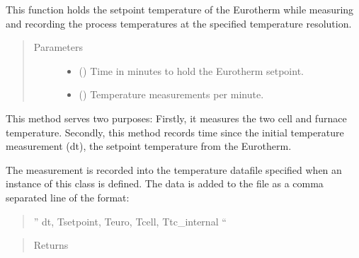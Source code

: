 \documentclass[letterpaper,10pt,english]{sphinxmanual}
\begin{document}
\begin{fulllineitems}
\begin{fulllineitems}
\label{\detokenize{vtipy_docs/vtipy:vtipy.temperature.temperature_controllers.hold}}
This function holds the setpoint temperature of the Eurotherm
while measuring and recording the process temperatures at the
specified temperature resolution.
\begin{quote}\begin{description}
\item[{Parameters}] \leavevmode\begin{itemize}
\item {} 
 () \textendash{} Time in minutes to hold the Eurotherm setpoint.

\item {} 
 () \textendash{} Temperature measurements per minute.

\end{itemize}

\end{description}\end{quote}

\end{fulllineitems}


\begin{fulllineitems}
\label{\detokenize{vtipy_docs/vtipy:vtipy.temperature.temperature_controllers.measure_temperatures}}
This method serves two purposes: Firstly, it measures the two cell and
furnace temperature. Secondly, this method records time since the
initial temperature measurement (dt), the setpoint temperature from
the Eurotherm.

The measurement is recorded into the temperature datafile specified
when an instance of this class is defined. The data is added to the
file as a comma separated line of the format:
\begin{quote}

” dt, Tsetpoint, Teuro, Tcell, Ttc\_internal “
\end{quote}
\begin{quote}\begin{description}
\item[{Returns}] \leavevmode
{}


\end{description}
\end{quote}
\end{fulllineitems}
\end{fulllineitems}
\end{document}
